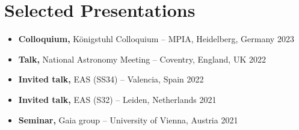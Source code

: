 \section*{Selected Presentations}

\begin{itemize}
    \item \textbf{Colloquium,} Königstuhl Colloquium -- MPIA, Heidelberg, Germany \hfill 2023
    \item \textbf{Talk,} National Astronomy Meeting -- Coventry, England, UK \hfill 2022
    \item \textbf{Invited talk,} EAS (SS34) -- Valencia, Spain \hfill 2022
    \item \textbf{Invited talk,} EAS (S32) -- Leiden, Netherlands \hfill 2021
    \item \textbf{Seminar,} Gaia group -- University of Vienna, Austria \hfill 2021
\end{itemize}